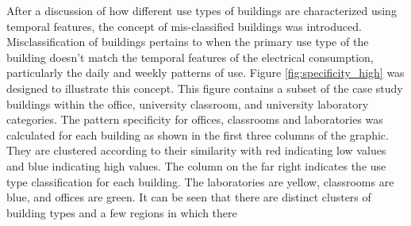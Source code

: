 After a discussion of how different use types of buildings are characterized using temporal features, the concept of mis-classified buildings was introduced. Misclassification of buildings pertains to when the primary use type of the building doesn't match the temporal features of the electrical consumption, particularly the daily and weekly patterns of use. Figure \ref{fig:specificity_high} was designed to illustrate this concept. This figure contains a subset of the case study buildings within the office, university classroom, and university laboratory categories. The pattern specificity for offices, classrooms and laboratories was calculated for each building as shown in the first three columns of the graphic. They are clustered according to their similarity with red indicating low values and blue indicating high values. The column on the far right indicates the use type classification for each building. The laboratories are yellow, classrooms are blue, and offices are green. It can be seen that there are distinct clusters of building types and a few regions in which there